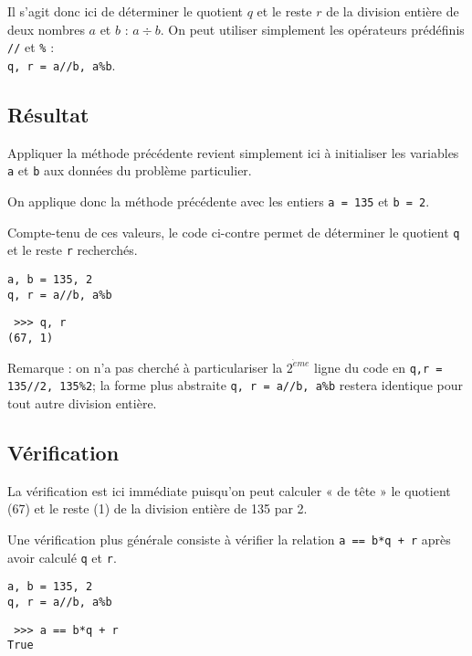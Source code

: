 Il s'agit donc ici de déterminer le quotient $q$ et le reste $r$ de la division
entière de deux nombres $a$ et $b$ : $a\div b$. On peut utiliser simplement les opérateurs
prédéfinis \texttt{//} et \texttt{\%} :\\
\texttt{q, r = a//b, a\%b}.

\subsection{Résultat}\label{affectation:nombres:resultat}
Appliquer la méthode précédente revient simplement ici à initialiser les variables
\texttt{a} et \texttt{b} aux données du problème particulier.

On applique donc la méthode précédente avec les entiers \texttt{a = 135}
et \texttt{b = 2}.

\noindent\begin{minipage}{7cm}
Compte-tenu de ces valeurs, le code \python{} ci-contre
permet de déterminer le quotient \texttt{q} et le reste 
\texttt{r} recherchés.
\end{minipage}
\hfill
\begin{minipage}{8cm}
\begin{lstlisting}[caption=\textbf{quotient et reste}]
a, b = 135, 2
q, r = a//b, a%b
\end{lstlisting}
\tt\footnotesize
>>> q, r\\
(67, 1)
\end{minipage}
\vspace*{2mm}

Remarque : on n'a pas cherché à 
particulariser la $2^{\grave eme}$ ligne du code en \texttt{q,r = 135//2, 135\%2};
la forme plus abstraite \texttt{q, r = a//b, a\%b}
restera identique pour tout autre division entière. 

\subsection{Vérification}\label{affectation:nombres:verification}
La vérification est ici immédiate puisqu'on peut calculer « de tête »
le quotient (67) et le reste (1) de la division entière de 135 par 2.

\noindent\begin{minipage}{7cm}
Une vérification plus générale consiste à vérifier la relation
\texttt{a == b*q + r} après avoir calculé \texttt{q} et \texttt{r}.
\end{minipage}
\hfill
\begin{minipage}{8cm}
\begin{lstlisting}
a, b = 135, 2
q, r = a//b, a%b
\end{lstlisting}
\tt\footnotesize
>>> a == b*q + r\\
True
\end{minipage}
\vspace*{2mm}


